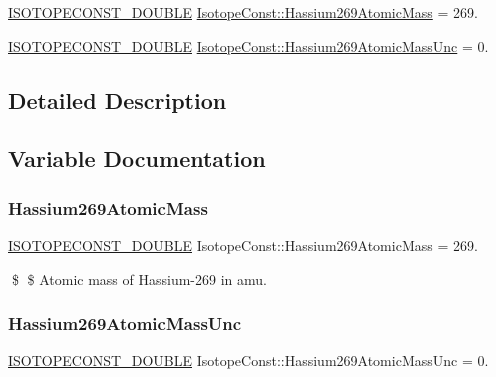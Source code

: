 \begin{DoxyCompactItemize}
\item 
\mbox{\hyperlink{group___isotope_const-_macros_ga8f45a7272ce02c0b4c65c44636ed719a}{I\+S\+O\+T\+O\+P\+E\+C\+O\+N\+S\+T\+\_\+\+D\+O\+U\+B\+LE}} \mbox{\hyperlink{group___isotope_const-_hassium-_hs269_gaee87f9fc3f92fbc0359f43e490b10b75}{Isotope\+Const\+::\+Hassium269\+Atomic\+Mass}} = 269.
\item 
\mbox{\hyperlink{group___isotope_const-_macros_ga8f45a7272ce02c0b4c65c44636ed719a}{I\+S\+O\+T\+O\+P\+E\+C\+O\+N\+S\+T\+\_\+\+D\+O\+U\+B\+LE}} \mbox{\hyperlink{group___isotope_const-_hassium-_hs269_gaef4b0d5536a1e21e653a27556e8eee77}{Isotope\+Const\+::\+Hassium269\+Atomic\+Mass\+Unc}} = 0.
\end{DoxyCompactItemize}


\subsection{Detailed Description}


\subsection{Variable Documentation}
\mbox{\label{group___isotope_const-_hassium-_hs269_gaee87f9fc3f92fbc0359f43e490b10b75}} 
\subsubsection{\texorpdfstring{Hassium269\+Atomic\+Mass}{Hassium269AtomicMass}}
{\footnotesize\ttfamily \mbox{\hyperlink{group___isotope_const-_macros_ga8f45a7272ce02c0b4c65c44636ed719a}{I\+S\+O\+T\+O\+P\+E\+C\+O\+N\+S\+T\+\_\+\+D\+O\+U\+B\+LE}} Isotope\+Const\+::\+Hassium269\+Atomic\+Mass = 269.}

\$ \$ Atomic mass of Hassium-\/269 in amu. \mbox{\label{group___isotope_const-_hassium-_hs269_gaef4b0d5536a1e21e653a27556e8eee77}} 
\subsubsection{\texorpdfstring{Hassium269\+Atomic\+Mass\+Unc}{Hassium269AtomicMassUnc}}
{\footnotesize\ttfamily \mbox{\hyperlink{group___isotope_const-_macros_ga8f45a7272ce02c0b4c65c44636ed719a}{I\+S\+O\+T\+O\+P\+E\+C\+O\+N\+S\+T\+\_\+\+D\+O\+U\+B\+LE}} Isotope\+Const\+::\+Hassium269\+Atomic\+Mass\+Unc = 0.}

